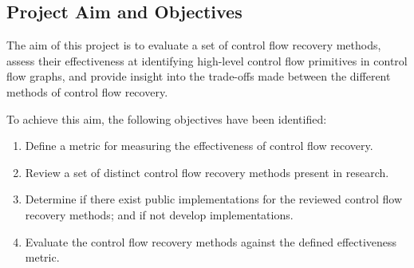 
\subsection{Project Aim and Objectives}

The aim of this project is to evaluate a set of control flow recovery methods, assess their effectiveness at identifying high-level control flow primitives in control flow graphs, and provide insight into the trade-offs made between the different methods of control flow recovery.

To achieve this aim, the following objectives have been identified:

\begin{enumerate}
	\item \label{itm:obj_define_effectiveness_metric} Define a metric for measuring the effectiveness of control flow recovery.
	\item \label{itm:obj_review_cfa_methods} Review a set of distinct control flow recovery methods present in research.
	\item \label{itm:obj_cfa_components} Determine if there exist public implementations for the reviewed control flow recovery methods; and if not develop implementations.
	\item \label{itm:obj_cfa_evaluation} Evaluate the control flow recovery methods against the defined effectiveness metric.
\end{enumerate}
